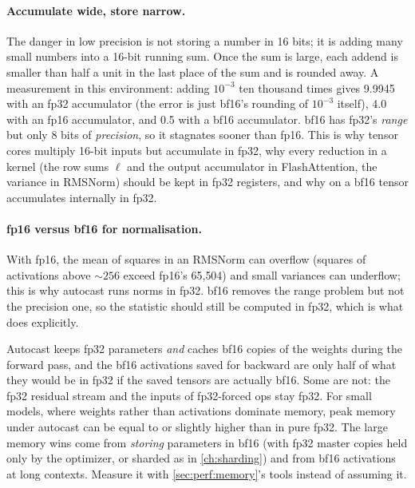 \paragraph{Accumulate wide, store narrow.} The danger in low precision is not storing a number in
16 bits; it is adding many small numbers into a 16-bit running sum. Once the sum is large, each
addend is smaller than half a unit in the last place of the sum and is rounded away. A
measurement in this environment: adding $10^{-3}$ ten thousand times gives 9.9945 with an fp32
accumulator (the error is just bf16's rounding of $10^{-3}$ itself), 4.0 with an fp16 accumulator,
and 0.5 with a bf16 accumulator. bf16 has fp32's \emph{range} but only 8 bits of \emph{precision},
so it stagnates sooner than fp16. This is why tensor cores multiply 16-bit inputs but accumulate in
fp32, why every reduction in a kernel (the row sums $\ell$ and the output accumulator in
FlashAttention, the variance in RMSNorm) should be kept in fp32 registers, and why
 on a bf16 tensor accumulates internally in fp32.

\paragraph{fp16 versus bf16 for normalisation.} With fp16, the mean of squares in an RMSNorm can
overflow (squares of activations above $\sim256$ exceed fp16's 65{,}504) and small variances can
underflow; this is why autocast runs norms in fp32. bf16 removes the range problem but not the
precision one, so the statistic should still be computed in fp32, which is what
 does explicitly.

\begin{pitfall}
Autocast keeps fp32 parameters \emph{and} caches bf16 copies of the weights during the forward
pass, and the bf16 activations saved for backward are only half of what they would be in fp32 if the
saved tensors are actually bf16. Some are not: the fp32 residual stream and the inputs of
fp32-forced ops stay fp32. For small models, where weights rather than activations dominate memory,
peak memory under autocast can be equal to or slightly higher than in pure fp32. The large memory
wins come from \emph{storing} parameters in bf16 (with fp32 master copies held only by the
optimizer, or sharded as in \cref{ch:sharding}) and from bf16 activations at long contexts.
Measure it with \cref{sec:perf:memory}'s tools instead of assuming it.
\end{pitfall}

